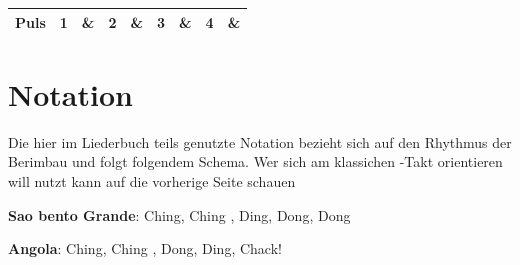 \documentclass[fontsize=14pt, paper=a4, twoside, DIV=20]{scrreprt} %
\begin{document}
{\begin{center}
\begin{tabularx}{\textwidth}{|c|c|X|X|X|X|X|X|X|X|}
        \multicolumn{2}{|c|}{Puls}        & \textbf{ 1} & \textbf{\&}           & \textbf{2} & \textbf{\&}          & \textbf{3}          & \textbf{\&}           & \textbf{4} & \textbf{\&}            \\ \hline
\end{tabularx}
\end{center}


}





\chapter*{Notation}

Die hier im Liederbuch teils genutzte Notation bezieht sich auf den Rhythmus der Berimbau und folgt folgendem Schema. Wer sich am klassichen -Takt orientieren will nutzt kann auf die vorherige Seite schauen

\textbf{Sao bento Grande}: Ching,  Ching , Ding, Dong, Dong

\textbf{Angola}: Ching,  Ching , Dong, Ding, Chack!
\end{document}
